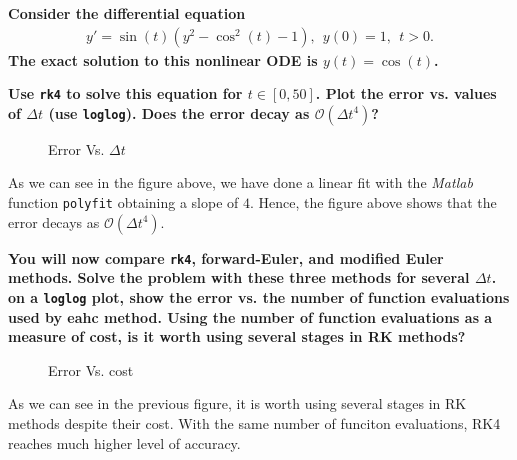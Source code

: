 \textbf{Consider the differential equation}
\begin{align*}
y' = \sin(t)(y^2 - \cos^2(t) -1),~~y(0)=1,~~t>0.
\end{align*}
\textbf{The exact solution to this nonlinear ODE is $y(t) = \cos(t)$.}

\textbf{Use \texttt{rk4} to solve this equation for $t \in [0,50]$. Plot the error vs. values of $\Delta t$ (use \texttt{loglog}). Does the error decay as $\mathcal{O}(\Delta t^4)$? }

\begin{figure}[H]
\caption{Error Vs. $\Delta t$}
\end{figure}

As we can see in the figure above, we have done a linear fit with the \textsl{Matlab} function \texttt{polyfit} obtaining a slope of $4$. Hence, the figure above shows that the error decays as $\mathcal{O}(\Delta t^4)$.


\textbf{You will now compare \texttt{rk4}, forward-Euler, and modified Euler methods. Solve the problem with these three methods for several $\Delta t$. on a \texttt{loglog} plot, show the error vs. the number of function evaluations used by eahc method. Using the number of function evaluations as a measure of cost, is it worth using several stages in RK methods? }

\begin{figure}[H]
\caption{Error Vs. cost}
\end{figure}

As we can see in the previous figure, it is worth using several stages in RK methods despite their cost. With the same number of funciton evaluations, RK4 reaches much higher level of accuracy. 

